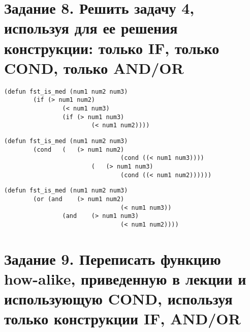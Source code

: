 \section{Задание 8. Решить задачу 4, используя для ее решения конструкции: только IF, только COND, только AND/OR}

\begin{lstlisting}
(defun fst_is_med (num1 num2 num3)
		(if (> num1 num2)
				(< num1 num3)
				(if (> num1 num3)
						(< num1 num2))))
\end{lstlisting}
\begin{lstlisting}
(defun fst_is_med (num1 num2 num3)
		(cond   (   (> num1 num2)
								(cond ((< num1 num3))))
						(   (> num1 num3)
								(cond ((< num1 num2))))))
\end{lstlisting}
\begin{lstlisting}
(defun fst_is_med (num1 num2 num3)
		(or (and    (> num1 num2)
								(< num1 num3))
				(and    (> num1 num3)
								(< num1 num2))))
\end{lstlisting}

\section{Задание 9. Переписать функцию how-alike, приведенную в лекции и использующую COND, используя только конструкции IF, AND/OR}

\clearpage